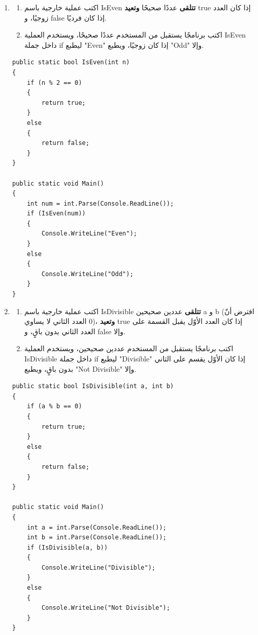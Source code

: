 \documentclass[14pt]{extarticle}
\begin{document}
\begin{enumerate}[resume, itemsep=2em]
\item
\begin{enumerate}
    \item اكتب عملية خارجية باسم \textenglish{IsEven} \textbf{تتلقى} عددًا صحيحًا \textbf{وتعيد} \textenglish{true} إذا كان العدد زوجيًا، و \textenglish{false} إذا كان فرديًا.
    \item اكتب برنامجًا يستقبل من المستخدم عددًا صحيحًا، ويستخدم العملية \textenglish{IsEven} داخل جملة \textenglish{if} ليطبع \textenglish{"Even"} إذا كان زوجيًا، ويطبع \textenglish{"Odd"} وإلا.
\end{enumerate}
\ifwithsols
\begin{boxSolution}
\begin{english}
\begin{verbatim}
public static bool IsEven(int n)
{
    if (n % 2 == 0)
    {
        return true;
    }
    else
    {
        return false;
    }
}

public static void Main()
{
    int num = int.Parse(Console.ReadLine());
    if (IsEven(num))
    {
        Console.WriteLine("Even");
    }
    else
    {
        Console.WriteLine("Odd");
    }
}
\end{verbatim}
\end{english}
\end{boxSolution}
\fi
\filbreak

\item
\begin{enumerate}
    \item اكتب عملية خارجية باسم \textenglish{IsDivisible} \textbf{تتلقى} عددين صحيحين \textenglish{a} و \textenglish{b} (افترض أنّ العدد الثاني لا يساوي $0$)، \textbf{وتعيد} \textenglish{true} إذا كان العدد الأوّل يقبل القسمة على العدد الثاني بدون باقٍ، و \textenglish{false} وإلا.
    \item اكتب برنامجًا يستقبل من المستخدم عددين صحيحين، ويستخدم العملية \\ \textenglish{IsDivisible} داخل جملة \textenglish{if} ليطبع \textenglish{"Divisible"} إذا كان الأوّل يقسم على الثاني بدون باقٍ، ويطبع \textenglish{"Not Divisible"} وإلا.
\end{enumerate}
\ifwithsols
\begin{boxSolution}
\begin{english}
\begin{verbatim}
public static bool IsDivisible(int a, int b)
{
    if (a % b == 0)
    {
        return true;
    }
    else
    {
        return false;
    }
}

public static void Main()
{
    int a = int.Parse(Console.ReadLine());
    int b = int.Parse(Console.ReadLine());
    if (IsDivisible(a, b))
    {
        Console.WriteLine("Divisible");
    }
    else
    {
        Console.WriteLine("Not Divisible");
    }
}
\end{verbatim}
\end{english}
\end{boxSolution}
\fi
\filbreak


\end{enumerate}
\end{document}
